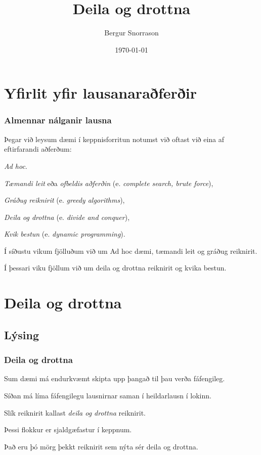 \title{Deila og drottna}
\author{Bergur Snorrason}
\date{\today}



\frame{\titlepage}

\section{Yfirlit yfir lausanaraðferðir}
{
    \frametitle{Almennar nálganir lausna}
    {
        \item<1-> Þegar við leysum dæmi í keppnisforritun notumst við oftast við eina af eftirfarandi aðferðum:
        {
            \item<2-> \emph{Ad hoc}.
            \item<3-> \emph{Tæmandi leit} eða \emph{ofbeldis aðferðin} (e. \emph{complete search, brute force}),
            \item<4-> \emph{Gráðug reiknirit} (e. \emph{greedy algorithms}),
            \item<5-> \emph{Deila og drottna} (e. \emph{divide and conquer}),
            \item<6-> \emph{Kvik bestun} (e. \emph{dynamic programming}).
        }
        \item<7-> Í síðustu vikum fjölluðum við um Ad hoc dæmi, tæmandi leit og gráðug reiknirit.
        \item<8-> Í þessari viku fjöllum við um deila og drottna reiknirit og kvika bestun.
    }
}

\section{Deila og drottna}
\subsection{Lýsing}
{
    \frametitle{Deila og drottna}
    {
        \item<1-> Sum dæmi má endurkvæmt skipta upp þangað til þau verða fáfengileg.
        \item<2-> Síðan má líma fáfengilegu lausnirnar saman í heildarlausn í lokinn.
        \item<3-> Slík reiknirit kallast \emph{deila og drottna} reiknirit.
        \item<4-> Þessi flokkur er sjaldgæfastur í keppnum.
        \item<5-> Það eru þó mörg þekkt reiknirit sem nýta sér deila og drottna.
    }
}

